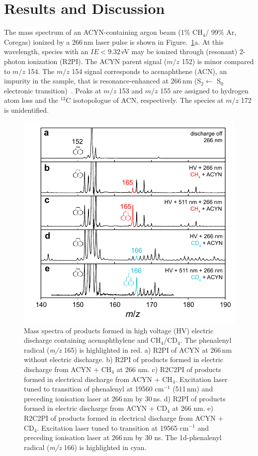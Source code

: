 \documentclass[journal=jacsat,manuscript=article,layout=onecolumn]{achemso}
\begin{document}
\section{Results and Discussion}

The mass spectrum of an ACYN-containing argon beam (1\% CH$_4$/ 99\% Ar, Coregas) ionized by a 266\,nm laser pulse is shown in Figure.~\ref{fig1}a. At this wavelength, species with an $IE < 9.32$\,eV may be ionized through (resonant) 2-photon ionization (R2PI). The ACYN parent signal ($m/z$ 152) is minor compared to $m/z$ 154. The $m/z$ 154 signal corresponds to acenaphthene (ACN), an impurity in the sample, that is resonance-enhanced at 266\,nm (S$_2 \leftarrow$ S$_0$ electronic transition)~\cite{swi91}. Peaks at $m/z$ 153 and $m/z$ 155 are assigned to hydrogen atom loss and the $^{13}$C isotopologue of ACN, respectively. The species at $m/z$ 172 is unidentified.

\begin{figure}[h!]
	\includegraphics[width=15cm]{Figures/Figure1}
	\caption{Mass spectra of products formed in high voltage (HV) electric discharge containing acenaphthylene and CH$_4$/CD$_4$. The phenalenyl radical (\textit{m/z} 165) is highlighted in red. a) R2PI of ACYN at 266\,nm without electric discharge. b) R2PI of products formed in electric discharge from ACYN + CH$_4$ at 266 nm. c) R2C2PI of products formed in electrical discharge from ACYN + CH$_4$. Excitation laser tuned to transition of phenalenyl at 19560 cm$^{-1}$ (511\,nm) and preceding ionisation laser at 266\,nm by 30\,ns. d) R2PI of products formed in electric discharge from ACYN + CD$_4$ at 266 nm. e) R2C2PI of products formed in electrical discharge from ACYN + CD$_4$. Excitation laser tuned to transition at 19565 cm$^{-1}$ and preceding ionisation laser at 266\,nm by 30 ns. The 1d-phenalenyl radical (\textit{m/z} 166) is highlighted in cyan.}
	\label{fig1}
\end{figure}
\end{document}
